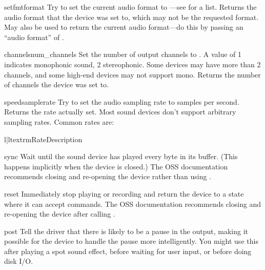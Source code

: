 \begin{methoddesc}{setfmt}{format}
Try to set the current audio format to ---see
 for a list.  Returns the audio format that the device
was set to, which may not be the requested format.  May also be used to
return the current audio format---do this by passing an ``audio format''
of
.  
\end{methoddesc}

\begin{methoddesc}{channels}{num_channels}
Set the number of output channels to .  A value of 1
indicates monophonic sound, 2 stereophonic.  Some devices may have more
than 2 channels, and some high-end devices may not support mono.
Returns the number of channels the device was set to.
\end{methoddesc}

\begin{methoddesc}{speed}{samplerate}
Try to set the audio sampling rate to  samples per
second.  Returns the rate actually set.  Most sound devices don't
support arbitrary sampling rates.  Common rates are:
\begin{tableii}{l|l}{textrm}{Rate}{Description}
\end{tableii}
\end{methoddesc}

\begin{methoddesc}{sync}{}
Wait until the sound device has played every byte in its buffer.  (This
happens implicitly when the device is closed.)  The OSS documentation
recommends closing and re-opening the device rather than using
.
\end{methoddesc}

\begin{methoddesc}{reset}{}
Immediately stop playing or recording and return the device to a
state where it can accept commands.  The OSS documentation recommends
closing and re-opening the device after calling .
\end{methoddesc}

\begin{methoddesc}{post}{}
Tell the driver that there is likely to be a pause in the output, making
it possible for the device to handle the pause more intelligently.  You
might use this after playing a spot sound effect, before waiting for
user input, or before doing disk I/O.
\end{methoddesc}

